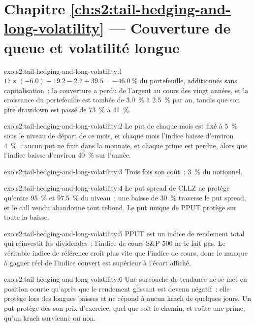\section*{Chapitre \ref{ch:s2:tail-hedging-and-long-volatility} --- Couverture de queue et volatilité longue}

\begin{solution}{exo:s2:tail-hedging-and-long-volatility:1}
$17 \times (-6.0) + 19.2 - 2.7 + 39.5 = -46.0~\%$ du portefeuille, additionnés sans capitalisation~: la couverture a perdu de l'argent au cours des vingt années, et la
croissance du portefeuille est tombée de 3.0~\% à 2.5~\% par an, tandis que son pire drawdown est passé de 73~\% à 41~\%.
\end{solution}

\begin{solution}{exo:s2:tail-hedging-and-long-volatility:2}
Le put de chaque mois est fixé à 5~\% sous le niveau de départ de ce mois, et chaque mois l'indice baisse d'environ 4~\%~: aucun put ne finit dans la monnaie, et chaque
prime est perdue, alors que l'indice baisse d'environ 40~\% sur l'année.
\end{solution}

\begin{solution}{exo:s2:tail-hedging-and-long-volatility:3}
Trois fois son coût~: 3~\% du notionnel.
\end{solution}

\begin{solution}{exo:s2:tail-hedging-and-long-volatility:4}
Le put spread de CLLZ ne protège qu'entre 95~\% et 97.5~\% du niveau~; une baisse de 30~\% traverse le put spread, et le call vendu abandonne tout
rebond. Le put unique de PPUT protège sur toute la baisse.
\end{solution}

\begin{solution}{exo:s2:tail-hedging-and-long-volatility:5}
PPUT est un indice de rendement total qui réinvestit les dividendes~; l'indice de cours S\&P 500 ne le fait pas. Le véritable indice de référence croît plus vite que l'indice de cours, donc
le manque à gagner réel de l'indice couvert est supérieur à l'écart affiché.
\end{solution}

\begin{solution}{exo:s2:tail-hedging-and-long-volatility:6}
Une surcouche de tendance ne se met en position courte qu'après que le rendement glissant est devenu négatif~: elle protège lors des longues baisses et ne répond à aucun krach de quelques jours. Un
put protège dès son prix d'exercice, quel que soit le chemin, et coûte une prime, qu'un krach survienne ou non.
\end{solution}

